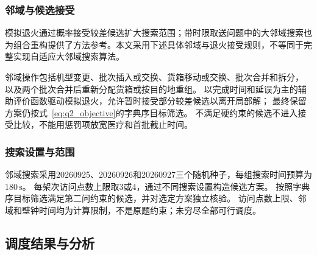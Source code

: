 \documentclass[bwprint]{gmcmthesis}
\begin{document}
\subsubsection{邻域与候选接受}
模拟退火通过概率接受较差候选扩大搜索范围\cite{kirkpatrick1983}；带时限取送问题中的大邻域搜索也为组合重构提供了方法参考\cite{ropke2006}。本文采用下述具体邻域与退火接受规则，不等同于完整实现自适应大邻域搜索算法。

邻域操作包括机型变更、批次插入或交换、货箱移动或交换、批次合并和拆分，
以及两个批次合并后重新分配货箱或按目的地重组。
以完成时间和延误为主的辅助评价函数驱动模拟退火，允许暂时接受部分较差候选以离开局部解；
最终保留方案仍按式~\eqref{eq:q2_objective}的字典序目标筛选。
不满足硬约束的候选不进入接受比较，不能用惩罚项放宽医疗和首批截止时间。

\subsubsection{搜索设置与范围}
邻域搜索采用20260925、20260926和20260927三个随机种子，每组搜索时间预算为$180\,\mathrm{s}$。
每架次访问点数上限取3或4，通过不同搜索设置构造候选方案。
按照字典序目标筛选满足第二问约束的候选，并对选定方案独立核验。
访问点数上限、邻域和壁钟时间均为计算限制，不是原题约束；未穷尽全部可行调度。

\subsection{调度结果与分析}
\end{document}
